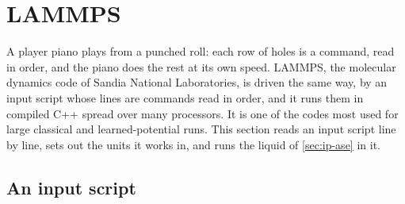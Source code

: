 \section{LAMMPS}
\label{sec:ip-lammps}

A player piano plays from a punched roll: each row of holes is a command,
read in order, and the piano does the rest at its own speed. LAMMPS, the
molecular dynamics code of Sandia National Laboratories\cite{Thompson2022},
is driven the same way, by an input script whose lines are commands read
in order, and it runs them in compiled C++ spread over many processors.
It is one of the codes most used for large classical and
learned-potential runs. This section reads an input script line by line, sets out the
units it works in, and runs the liquid of \cref{sec:ip-ase} in it.

\subsection*{An input script}

